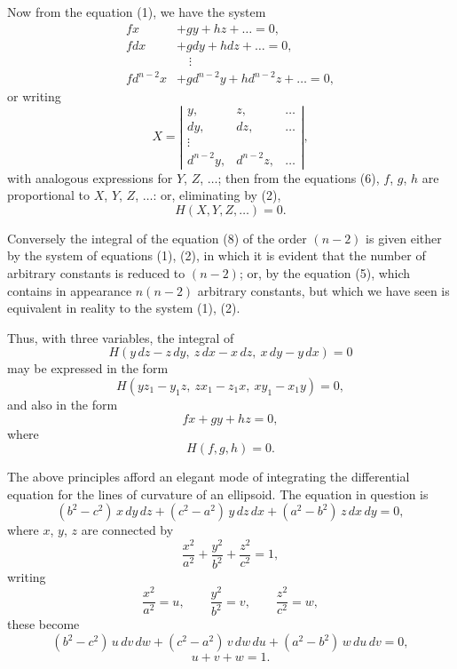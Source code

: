 \documentclass[11pt]{article}
\begin{document}
Now from the equation (1), we have the system
\[
\begin{aligned}
f x       &+ g y       + h z       + \ldots = 0, \\
f dx      &+ g dy      + h dz      + \ldots = 0, \\
&\quad\vdots \\
f d^{n-2} x &+ g d^{n-2} y + h d^{n-2} z + \ldots = 0,
\end{aligned}
\tag{6}
\]
or writing
\[
X = \left|\begin{array}{ccc} y, & z, & \ldots \\ dy, & dz, & \ldots \\ \vdots & & \\ d^{n-2} y, & d^{n-2} z, & \ldots \end{array}\right| \tag{7},
\]
with analogous expressions for $Y$, $Z$, $\ldots$; then from the equations (6), $f$, $g$, $h$ are proportional to $X$, $Y$, $Z$, $\ldots$: or, eliminating by (2),
\[
H(X, Y, Z, \ldots) = 0 \tag{8}.
\]

Conversely the integral of the equation (8) of the order $(n-2)$ is given either by the system of equations (1), (2), in which it is evident that the number of arbitrary constants is reduced to $(n-2)$; or, by the equation (5), which contains in appearance $n(n-2)$ arbitrary constants, but which we have seen is equivalent in reality to the system (1), (2).

Thus, with three variables, the integral of
\[
H(y\,dz - z\,dy,\ z\,dx - x\,dz,\ x\,dy - y\,dx) = 0 \tag{9}
\]
may be expressed in the form
\[
H(y z_1 - y_1 z,\ z x_1 - z_1 x,\ x y_1 - x_1 y) = 0 \tag{10},
\]
and also in the form
\[
f x + g y + h z = 0 \tag{11},
\]
where
\[
H(f, g, h) = 0 \tag{12}.
\]

The above principles afford an elegant mode of integrating the differential equation for the lines of curvature of an ellipsoid. The equation in question is
\[
(b^2 - c^2)\,x\,dy\,dz + (c^2 - a^2)\,y\,dz\,dx + (a^2 - b^2)\,z\,dx\,dy = 0 \tag{13},
\]
where $x$, $y$, $z$ are connected by
\[
\frac{x^2}{a^2} + \frac{y^2}{b^2} + \frac{z^2}{c^2} = 1 \tag{14},
\]
writing
\[
\frac{x^2}{a^2} = u, \qquad \frac{y^2}{b^2} = v, \qquad \frac{z^2}{c^2} = w \tag{15},
\]
these become
\[
(b^2 - c^2)\,u\,dv\,dw + (c^2 - a^2)\,v\,dw\,du + (a^2 - b^2)\,w\,du\,dv = 0 \tag{16},
\]
\[
u + v + w = 1 \tag{17}.
\]
\end{document}
